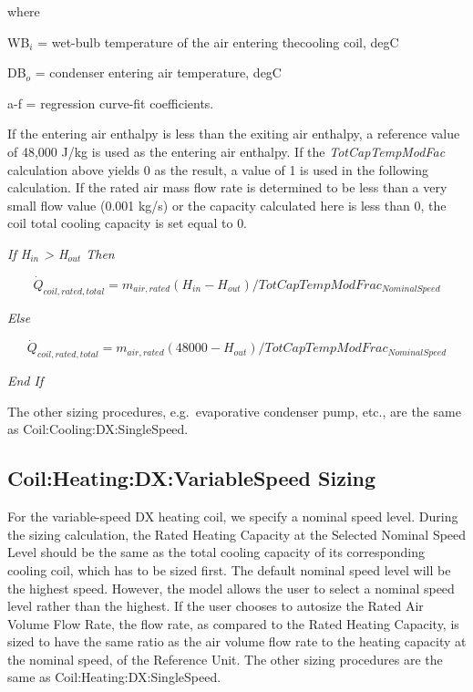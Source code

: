 where

WB\(_{i}\) = wet-bulb temperature of the air entering thecooling coil, degC

DB\(_{o}\) = condenser entering air temperature, degC

a-f = regression curve-fit coefficients.

If the entering air enthalpy is less than the exiting air enthalpy, a reference value of 48,000 J/kg is used as the entering air enthalpy. If the \emph{TotCapTempModFac} calculation above yields 0 as the result, a value of 1 is used in the following calculation. If the rated air mass flow rate is determined to be less than a very small flow value (0.001 kg/s) or the capacity calculated here is less than 0, the coil total cooling capacity is set equal to 0.

\emph{If H\(_{in}\) \textgreater{} H\(_{out}\) Then}

\begin{equation}
{\dot Q_{coil,rated,total}} = {m_{air,rated}}({H_{in}} - {H_{out}})/TotCapTempModFra{c_{NominalSpeed}}
\end{equation}

\emph{Else}

\begin{equation}
{\dot Q_{coil,rated,total}} = {m_{air,rated}}(48000 - {H_{out}})/TotCapTempModFra{c_{NominalSpeed}}
\end{equation}

\emph{End If}

The other sizing procedures, e.g.~evaporative condenser pump, etc., are the same as Coil:Cooling:DX:SingleSpeed.

\subsection{Coil:Heating:DX:VariableSpeed Sizing}\label{coilheatingdxvariablespeed-sizing}

For the variable-speed DX heating coil, we specify a nominal speed level. During the sizing calculation, the Rated Heating Capacity at the Selected Nominal Speed Level should be the same as the total cooling capacity of its corresponding cooling coil, which has to be sized first. The default nominal speed level will be the highest speed. However, the model allows the user to select a nominal speed level rather than the highest. If the user chooses to autosize the Rated Air Volume Flow Rate, the flow rate, as compared to the Rated Heating Capacity, is sized to have the same ratio as the air volume flow rate to the heating capacity at the nominal speed, of the Reference Unit. The other sizing procedures are the same as Coil:Heating:DX:SingleSpeed.

